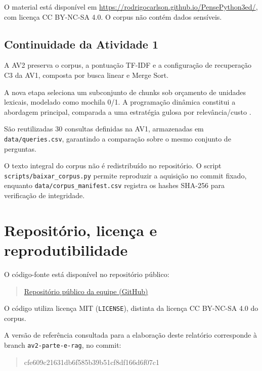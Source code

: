 \documentclass[11pt,a4paper]{article}
\theoremstyle{plain}
\theoremstyle{definition}
\theoremstyle{plain}
\begin{document}
O material está disponível em
\url{https://rodrigocarlson.github.io/PensePython3ed/},
com licença CC BY-NC-SA 4.0.
O corpus não contém dados sensíveis.

\subsection{Continuidade da Atividade 1}

A AV2 preserva o corpus, a pontuação
TF-IDF e a configuração de recuperação
C3 da AV1, composta por busca linear
e Merge Sort.

A nova etapa seleciona um subconjunto
de chunks sob orçamento de unidades
lexicais, modelado como mochila 0/1.
A programação dinâmica constitui a
abordagem principal, comparada a uma
estratégia gulosa por relevância/custo
\cite{kleinberg2005algorithm}.

São reutilizadas 30 consultas definidas
na AV1, armazenadas em
\texttt{data/queries.csv}, garantindo
a comparação sobre o mesmo conjunto
de perguntas.

O texto integral do corpus não é
redistribuído no repositório.
O script \texttt{scripts/baixar\_corpus.py}
permite reproduzir a aquisição no
commit fixado, enquanto
\texttt{data/corpus\_manifest.csv}
registra os hashes SHA-256 para
verificação de integridade.


\section{Repositório, licença e reprodutibilidade}

O código-fonte está disponível no
repositório público:

\begin{quote}
\footnotesize
\href{https://github.com/joaocss/PAA_UFS_2026_2_SenaSa_Joao_Bispo_Hernandison_Galvao_Nadianne_Goto_Rafael_Leal_Helena_Silva_Eduardo}{Repositório público da equipe (GitHub)}
\end{quote}


O código utiliza licença MIT
(\texttt{LICENSE}), distinta da licença
CC BY-NC-SA 4.0 do corpus.

A versão de referência consultada para
a elaboração deste relatório corresponde
à branch \texttt{av2-parte-e-rag},
no commit:

\begin{quote}
\small\ttfamily
cfe609c21631db6f585b39b51cf8df166d6f07c1
\end{quote}
\end{document}
